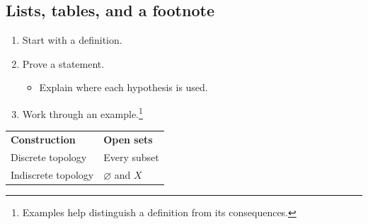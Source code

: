 \documentclass[11pt]{article}
\begin{document}
\subsection{Lists, tables, and a footnote}
\begin{enumerate}
\item Start with a definition.
\item Prove a statement.
  \begin{itemize}\item Explain where each hypothesis is used.\end{itemize}
\item Work through an example.\footnote{Examples help distinguish a definition from its consequences.}
\end{enumerate}
\begin{center}
\begin{tabular}{ll}
\textbf{Construction} & \textbf{Open sets}\\
Discrete topology & Every subset\\
Indiscrete topology & $\varnothing$ and $X$
\end{tabular}
\end{center}
\end{document}
